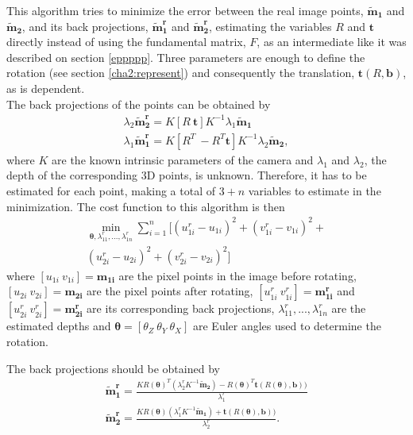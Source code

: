 This algorithm tries to minimize the error between the real image points, $\mathbf{\tilde{m}_1}$ and $\mathbf{\tilde{m}_2}$, and its back projections, $\mathbf{\tilde{m}^r_1}$ and $\mathbf{\tilde{m}^r_2}$, estimating the variables $R$ and $\mathbf{t}$ directly instead of using the fundamental matrix, $F$, as an intermediate like it was described on section \ref{eppppp}. Three parameters are enough to define the rotation (see section \ref{cha2:represent}) and consequently the translation, $\mathbf{t}(R, \mathbf{b})$, as is dependent.\\
The back projections of the points can be obtained by
\begin{align}
\label{cha2:epipolar:shitshit1}
\lambda_2 \mathbf{\tilde{m}^r_2} = K [ R \ \mathbf{t} ] K^{-1} \lambda_1 \mathbf{\tilde{m}_1}\\
\label{cha2:epipolar:shitshit2}
\lambda_1 \mathbf{\tilde{m}^r_1} =  K [ R^{T} \ -R^{T}\mathbf{t} ] K^{-1}  \lambda_2 \mathbf{\tilde{m}_2},
\end{align}
where $K$ are the known intrinsic parameters of the camera and $\lambda_1$ and $\lambda_2$, the depth of the corresponding 3D points, is unknown. Therefore, it has to be estimated for each point, making a total of $3+n$ variables to estimate in the minimization.
The cost function to this algorithm is then
\begin{equation}
\label{fiorenfe}
\begin{split}
   	\min_{\mathbf{\theta}, \lambda^r_{11}, ..., \lambda^r_{1n}} \sum^n_{i=1} [(u^r_{1i}-u_{1i})^2  + (v^r_{1i}-v_{1i})^2 +\\ (u^r_{2i}-u_{2i})^2 + (v^r_{2i}-v_{2i})^2] 
\end{split}
\end{equation}
where $[u_{1i} \ v_{1i}] = \mathbf{m_{1i}}$ are the pixel points in the image before rotating, $[u_{2i} \ v_{2i}] = \mathbf{m_{2i}}$ are the pixel points after rotating, $[u_{1i}^r \ v_{1i}^r] = \mathbf{m_{1i}^r}$ and $[u_{2i}^r \ v_{2i}^r] = \mathbf{m_{2i}^r}$ are its corresponding back projections, $\lambda^r_{11}, ..., \lambda^r_{1n}$ are the estimated depths and $\mathbf{\theta} = [\theta_Z \ \theta_Y \ \theta_X]$ are Euler angles used to determine the rotation.

The back projections should be obtained by
\begin{align*}
	\mathbf{\tilde{m}_{1}^r} = \frac{KR(\mathbf{ \theta})^T(\lambda_{2}^r K^{-1}\mathbf{\tilde{m}_2}) - R(\mathbf{ \theta})^T \mathbf{t}(R(\mathbf{ \theta}), \mathbf{b}))}{\lambda_{1}^r}\\
	\mathbf{\tilde{m}_{2}^r} = \frac{KR(\mathbf{ \theta})(\lambda_{1}^r K^{-1}\mathbf{\tilde{m}_1}) + \mathbf{t}(R(\mathbf{ \theta}), \mathbf{b}))}{\lambda_{2}^r}.
\end{align*} 

